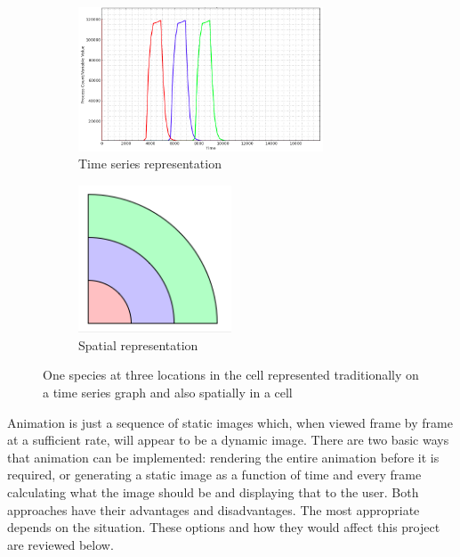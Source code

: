 \begin{figure}[h!]
    \centering
    \begin{subfigure}[b]{0.4\textwidth}
        \centering
        \includegraphics[width=0.8\textwidth]{images/asrc_graph_intro.png}
        \caption{Time series representation}
        \label{fig:asrc_graph_work}
    \end{subfigure}
    \begin{subfigure}[b]{0.4\textwidth}
        \centering
        \includegraphics[width=0.5\textwidth]{images/asrc_cell_intro.png}
        \caption{Spatial representation}
        \label{fig:asrc_cell_work}
    \end{subfigure}
    \caption{One species at three locations in the cell represented traditionally on a time series graph and also spatially in a cell}
    \label{fig:asrc_work}
\end{figure}

Animation is just a sequence of static images which, when viewed frame by frame at a sufficient rate, will appear to be a dynamic image.  There are two basic ways that animation can be implemented: rendering the entire animation before it is required, or generating a static image as a function of time and every frame calculating what the image should be and displaying that to the user.  Both approaches have their advantages and disadvantages.  The most appropriate depends on the situation.  These options and how they would affect this project are reviewed below.

